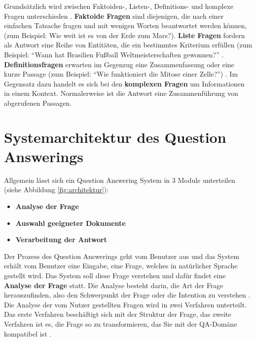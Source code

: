 \documentclass[
        ngerman,
        paper=a4,
        numbers=noendperiod,
]{scrreprt}
\begin{document}
Grundsätzlich wird zwischen Faktoiden-, Listen-, Definitions- und komplexe Fragen unterschieden \citep{Kolomiyets2011APerspective}. \textbf{Faktoide Fragen} sind diejenigen, die nach einer einfachen Tatsache fragen und mit wenigen Worten beantwortet werden können, (zum Beispiel: Wie weit ist es von der Erde zum Mars?). \textbf{Liste Fragen} fordern als Antwort eine Reihe von Entitäten, die ein bestimmtes Kriterium erfüllen (zum Beispiel: \enquote{Wann hat Brasilien Fußball Weltmeisterschaften gewonnen?} \citep{Heie2012QuestionModelling}. \textbf{Definitionsfragen} erwarten im Gegenzug eine Zusammenfassung oder eine kurze Passage (zum Beispiel: \enquote{Wie funktioniert die Mitose einer Zelle?}) \citep{Neves2015QuestionBiology}. Im Gegensatz dazu handelt es sich bei den \textbf{komplexen Fragen} um Informationen in einem Kontext. Normalerweise ist die Antwort eine Zusammenführung von abgerufenen Passagen.


\section{Systemarchitektur des Question Answerings} %

%

Allgemein lässt sich ein Question Answering System in 3 Module unterteilen (siehe Abbildung \ref{fig:architektur}):
\begin{itemize}
    \item \textbf{Analyse der Frage}
    \item \textbf{Auswahl geeigneter Dokumente}
    \item \textbf{Verarbeitung der Antwort} 
\end{itemize}

Der Prozess des Question Answerings geht vom Benutzer aus und das System erhält vom Benutzer eine Eingabe, eine Frage, welches in natürlicher Sprache gestellt wird. Das System soll diese Frage verstehen und dafür findet eine \textbf{Analyse der Frage} statt. Die Analyse besteht darin, die Art der Frage herauszufinden, also den Schwerpunkt der Frage oder die Intention zu verstehen \citep{Malik2013DomainSystem}. Die Analyse der vom Nutzer gestellten Fragen wird in zwei Verfahren unterteilt. Das erste Verfahren beschäftigt sich mit der Struktur der Frage, das zweite Verfahren ist es, die Frage so zu transformieren, das Sie mit der QA-Domäne kompatibel ist \citep{Hamed2016AClassification}.
\end{document}
